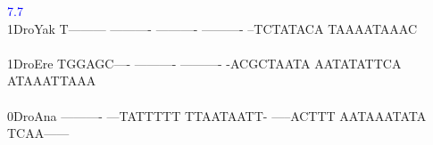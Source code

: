 \documentclass[11pt,twoside,reqno,a4paper]{article}
\begin{document}
{\hspace*{4\charwidth}\hspace*{7\charwidth}\hspace*{2\charwidth}\textcolor{blue}{7.7}\hspace*{1\charwidth}\hspace*{1\charwidth}\hspace*{1\charwidth}\hspace*{1\charwidth}\hspace*{1\charwidth}\hspace*{1\charwidth}\\
1\hspace*{3\charwidth}DroYak	T---------	----------	----------	----------	--TCTATACA	TAAAATAAAC	\\
\hspace*{4\charwidth}\hspace*{7\charwidth}\hspace*{1\charwidth}\hspace*{1\charwidth}\hspace*{1\charwidth}\hspace*{1\charwidth}\hspace*{1\charwidth}\hspace*{1\charwidth}\\
1\hspace*{3\charwidth}DroEre	TGGAGC----	----------	----------	-ACGCTAATA	AATATATTCA	ATAAATTAAA	\\
\hspace*{4\charwidth}\hspace*{7\charwidth}\hspace*{1\charwidth}\hspace*{1\charwidth}\hspace*{1\charwidth}\hspace*{1\charwidth}\hspace*{1\charwidth}\hspace*{1\charwidth}\\
0\hspace*{3\charwidth}DroAna	----------	---TATTTTT	TTAATAATT-	-----ACTTT	AATAAATATA	TCAA------	\\
\hspace*{4\charwidth}\hspace*{7\charwidth}\hspace*{1\charwidth}\hspace*{1\charwidth}\hspace*{1\charwidth}\hspace*{1\charwidth}\hspace*{1\charwidth}\hspace*{1\charwidth}\\
}
\end{document}
